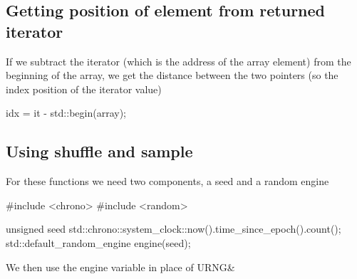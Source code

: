 \documentclass{report}
\begin{document}
    \bigbreak \noindent 
    \subsection{Getting position of element from returned iterator}
    \bigbreak \noindent 
    \begin{concept}
        If we subtract the iterator (which is the address of the array element) from the beginning of the array, we get the distance between the two pointers (so the index position of the iterator value) 
        \bigbreak \noindent 
        \begin{cppcode}
        idx = it - std::begin(array);
        \end{cppcode}
    \end{concept}

    \bigbreak \noindent 
    \subsection{Using shuffle and sample}
    \bigbreak \noindent 
    For these functions we need two components, a seed and a random engine
    \bigbreak \noindent 
    \begin{cppcode}
#include <chrono>
#include <random>

unsigned seed std::chrono::system_clock::now().time_since_epoch().count();
std::default_random_engine engine(seed);
    \end{cppcode}
    \bigbreak \noindent 
    We then use the engine variable in place of URNG\&

    \bigbreak \noindent 
\end{document}
